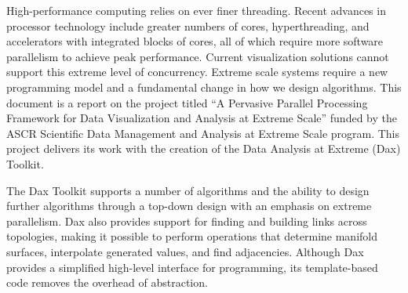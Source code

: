 
High-performance computing relies on ever finer threading. Recent advances
in processor technology include greater numbers of cores, hyperthreading,
and accelerators with integrated blocks of cores, all of which require more
software parallelism to achieve peak performance. Current visualization
solutions cannot support this extreme level of concurrency. Extreme scale
systems require a new programming model and a fundamental change in how we
design algorithms. This document is a report on the project titled ``A
Pervasive Parallel Processing Framework for Data Visualization and Analysis
at Extreme Scale'' funded by the ASCR Scientific Data Management and
Analysis at Extreme Scale program. This project delivers its work with the
creation of the Data Analysis at Extreme (Dax) Toolkit.

The Dax Toolkit supports a number of algorithms and the ability to design
further algorithms through a top-down design with an emphasis on extreme
parallelism. Dax also provides support for finding and building links
across topologies, making it possible to perform operations that determine
manifold surfaces, interpolate generated values, and find
adjacencies. Although Dax provides a simplified high-level interface for
programming, its template-based code removes the overhead of abstraction.

